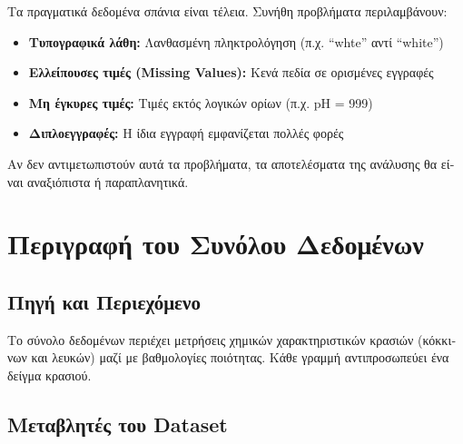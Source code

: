 \documentclass[12pt,a4paper]{article}
\begin{document}
\textgreek{Τα πραγματικά δεδομένα σπάνια είναι τέλεια. Συνήθη προβλήματα περιλαμβάνουν:}

\begin{itemize}
    \item \textbf{\textgreek{Τυπογραφικά λάθη:}} \textgreek{Λανθασμένη πληκτρολόγηση (π.χ. ``whte'' αντί ``white'')}
    \item \textbf{\textgreek{Ελλείπουσες τιμές (Missing Values):}} \textgreek{Κενά πεδία σε ορισμένες εγγραφές}
    \item \textbf{\textgreek{Μη έγκυρες τιμές:}} \textgreek{Τιμές εκτός λογικών ορίων (π.χ. pH = 999)}
    \item \textbf{\textgreek{Διπλοεγγραφές:}} \textgreek{Η ίδια εγγραφή εμφανίζεται πολλές φορές}
\end{itemize}

\textgreek{Αν δεν αντιμετωπιστούν αυτά τα προβλήματα, τα αποτελέσματα της ανάλυσης θα είναι αναξιόπιστα ή παραπλανητικά.}

\section{\textgreek{Περιγραφή του Συνόλου Δεδομένων}}

\subsection{\textgreek{Πηγή και Περιεχόμενο}}

\textgreek{Το σύνολο δεδομένων περιέχει μετρήσεις χημικών χαρακτηριστικών κρασιών (κόκκινων και λευκών) μαζί με βαθμολογίες ποιότητας. Κάθε γραμμή αντιπροσωπεύει ένα δείγμα κρασιού.}

\subsection{\textgreek{Μεταβλητές του Dataset}}
\end{document}
